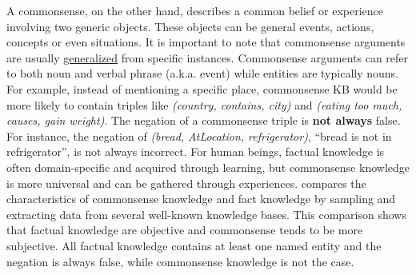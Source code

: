 A commonsense, on the other hand, describes a common belief or 
experience involving two generic objects. 
These objects can be general events, actions, concepts or even situations. 
It is important to note that commonsense arguments are usually \uline{generalized} 
from specific instances.
Commonsense arguments can refer to both noun and verbal phrase (a.k.a. event) 
while entities are typically nouns. For example, instead of mentioning a 
specific place, commonsense KB would be more likely to contain triples like 
\textit{(country, contains, city)} and  \textit{(eating too much, causes, 
gain weight)}. 
The negation of a commonsense triple is \textbf{not always} false. 
For instance, the negation of \textit{(bread, AtLocation, refrigerator)}, 
``bread is not in refrigerator'', is not always incorrect. 
For human beings, factual knowledge is often domain-specific and acquired
through learning, but commonsense knowledge is more universal and can be
gathered through experiences.  compares the characteristics of commonsense knowledge and fact knowledge by sampling and extracting data from several well-known knowledge bases.  This comparison shows that factual knowledge are objective and commonsense tends to be more subjective. All factual knowledge contains at least one named entity and the negation is always false, while commonsense knowledge is not the case.




